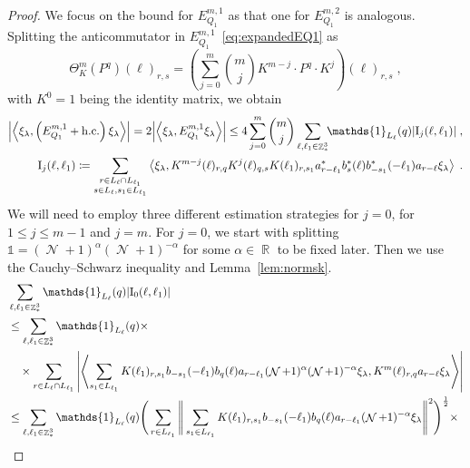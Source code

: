 \documentclass[12pt,a4paper]{article}
\numberwithin{equation}{section}
\newcommand{\1}{\mathbb{I}}
\newcommand{\I}{\mathrm{I}}
\DeclareMathOperator{\R}{\mathbb{R}}
\DeclareMathOperator{\Z}{\mathbb{Z}}
\DeclareMathOperator{\NN}{\mathcal{N}}
\newcommand{\half}{\frac{1}{2}}
\newcommand{\eva}[1]{\left\langle #1 \right\rangle}
\theoremstyle{plain}
\theoremstyle{definition}
\theoremstyle{remark}
\theoremstyle{plain}
\theoremstyle{definition}
\theoremstyle{remark}
\begin{document}
\begin{proof}
We focus on the bound for $ E^{m,1}_{Q_1} $ as that one for $ E^{m,2}_{Q_1} $ is analogous. Splitting the anticommutator in $ E^{m,1}_{Q_1} $~\eqref{eq:expandedEQ1} as
\begin{equation} \label{eq:q-q}
	\Theta^m_K(P^q)(\ell)_{r,s}
	= \left(\sum\limits_{j=0}^m {{m}\choose j} K^{m-j} \cdot P^q \cdot K^{j}\right) \! (\ell)_{r,s} \;,
\end{equation}
with $ K^0 = 1 $ being the identity matrix, we obtain
\begin{equation} \label{eq:EQ1111}
\begin{aligned}
	\abs{\eva{\xi_\lambda,\left(E^{m,1}_{Q_1}+\mathrm{h.c.}\right) \xi_\lambda }} 
	= 2\abs{\eva{\xi_\lambda, E^{m,1}_{Q_1} \xi_\lambda }}
	\le 4 \sum_{j=0}^m {{m}\choose j} \sum\limits_{\ell,\ell_1  \in \Z^3_*}\!\! \mathds{1}_{L_\ell}(q) |\I_j(\ell, \ell_1)| \;,\\
	\I_j(\ell, \ell_1)
	\coloneq \sum\limits_{\substack{r\in L_{\ell} \cap L_{\ell_1}\\ s \in L_{\ell},s_1\in L_{\ell_1}}}
		\eva{\xi_\lambda, K^{m-j}(\ell)_{r,q} K^{j}(\ell)_{q,s} K(\ell_1)_{r,s_1} a^*_{r-\ell_1} b^*_{s}(\ell) b^*_{-s_1}(-\ell_1) a_{r-\ell} \xi_\lambda} \;. \\
\end{aligned}
\end{equation}
We will need to employ three different estimation strategies for $ j = 0 $, for $ 1 \le j \le m-1 $ and $ j = m $. For $ j = 0 $, we start with splitting $\mathds{1} = (\NN+1)^{\alpha}(\NN+1)^{-\alpha}$ for some $\alpha \in \R$ to be fixed later. Then we use the Cauchy--Schwarz inequality and Lemma~\ref{lem:normsk}.
\textcolor{green!30!black}{
\begin{align}
	&\sum_{\ell,\ell_1 \in \Z^3_*} \mathds{1}_{L_\ell}(q) |\I_0(\ell, \ell_1)| \nonumber\\
	&\le \sum_{\ell,\ell_1 \in \Z^3_*} \mathds{1}_{L_\ell}(q) \times \nonumber\\
	&\quad \times \sum\limits_{r \in L_\ell \cap L_{\ell_1}} \abs{\eva{ \sum\limits_{s_1 \in L_{\ell_1}} K(\ell_1)_{r,s_1} b_{-s_1}(-\ell_1) b_{q}(\ell) a_{r-\ell_1} (\NN+1)^{\alpha} (\NN+1)^{-\alpha} \xi_\lambda, K^{m}(\ell)_{r,q} a_{r-\ell} \xi_\lambda }}\nonumber\\
	&\leq \sum_{\ell,\ell_1 \in \Z^3_*} \mathds{1}_{L_\ell}(q) \Bigg( \sum\limits_{r \in L_{\ell_1}} \Bigg\Vert \sum\limits_{s_1 \in L_{\ell_1}} K(\ell_1)_{r,s_1} b_{-s_1}(-\ell_1) b_{q}(\ell) a_{r-\ell_1} (\NN+1)^{-\alpha}\xi_\lambda \Bigg\Vert^2\Bigg)^\half \times\nonumber\\

\end{align}}
\end{proof}
\end{document}
